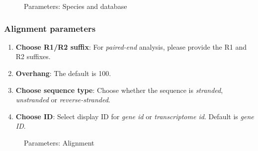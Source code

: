 \documentclass[
  a4paper,
  DIV=11,
  numbers=noendperiod,
  oneside,
  open=any]{scrreport}
\providecommand{\tightlist}{%
  \setlength{\itemsep}{0pt}\setlength{\parskip}{0pt}}\usepackage{longtable,booktabs,array}
\begin{document}
\begin{figure}[H]


\caption{\label{fig-trans4}Parameters: Species and database}

\end{figure}%

\subsubsection{Alignment parameters}\label{alignment-parameters}

\begin{enumerate}
\def\labelenumi{\arabic{enumi}.}
\tightlist
\item
  \textbf{Choose R1/R2 suffix}: For \emph{paired-end} analysis, please
  provide the R1 and R2 suffixes.
\item
  \textbf{Overhang}: The default is 100.
\item
  \textbf{Choose sequence type}: Choose whether the sequence is
  \emph{stranded}, \emph{unstranded} or \emph{reverse-stranded}.
\item
  \textbf{Choose ID}: Select display ID for \emph{gene id} or
  \emph{transcriptome id}. Default is \emph{gene ID}.
\end{enumerate}

\begin{figure}[H]


\caption{\label{fig-trans5}Parameters: Alignment}

\end{figure}%
\end{document}
